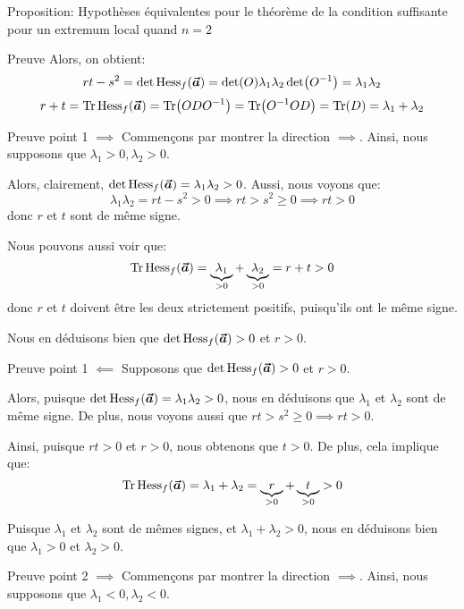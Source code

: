 \documentclass[a4paper]{article}
\begin{document}
\begin{parag}{Proposition: Hypothèses équivalentes pour le théorème de la condition suffisante pour un extremum local quand $n = 2$}
\begin{subparag}{Preuve}
        Alors, on obtient: 
        \[rt - s^2 = \det\Hess_f\left(\bvec{a}\right) = \det\left(O\right)\lambda_1 \lambda_2 \det\left(O^{-1}\right) = \lambda_1 \lambda_2\] 
        \[r + t = \Tr\Hess_f\left(\bvec{a}\right) = \Tr\left(O D O^{-1}\right) = \Tr\left(O^{-1} O D\right) = \Tr\left(D\right) = \lambda_1 + \lambda_2\]
    \end{subparag}

    \begin{subparag}{Preuve point 1 $\implies$}
         Commençons par montrer la direction $\implies$. Ainsi, nous supposons que $\lambda_1 > 0, \lambda_2 > 0$.

         Alors, clairement, $\det\Hess_f\left(\bvec{a}\right) = \lambda_1 \lambda_2 > 0$. Aussi, nous voyons que: 
         \[\lambda_1 \lambda_2 = rt - s^2 > 0 \implies rt > s^2 \geq 0 \implies rt > 0\]
         donc $r$ et $t$ sont de même signe.

         Nous pouvons aussi voir que: 
         \[\Tr\Hess_f\left(\bvec{a}\right) = \underbrace{\lambda_1}_{> 0} + \underbrace{\lambda_2}_{> 0} = r + t > 0\]
         donc $r$ et $t$ doivent être les deux strictement positifs, puisqu'ils ont le même signe.

         Nous en déduisons bien que $\det\Hess_f\left(\bvec{a}\right) > 0$ et $r > 0$.
    \end{subparag}
    
    \begin{subparag}{Preuve point 1 $\impliedby$}
        Supposons que $\det\Hess_f\left(\bvec{a}\right) > 0$ et $r > 0$.

        Alors, puisque $\det\Hess_f\left(\bvec{a}\right) = \lambda_1 \lambda_2 > 0$, nous en déduisons que $\lambda_1$ et $\lambda_2$ sont de même signe. De plus, nous voyons aussi que $rt > s^2 \geq 0 \implies rt > 0$.

        Ainsi, puisque $rt > 0$ et $r > 0$, nous obtenons que $t > 0$. De plus, cela implique que: 
        \[\Tr\Hess_f\left(\bvec{a}\right) = \lambda_1 + \lambda_2 = \underbrace{r}_{> 0} + \underbrace{t}_{> 0} > 0\]
        
        Puisque $\lambda_1$ et $\lambda_2$ sont de mêmes signes, et $\lambda_1 + \lambda_2 > 0$, nous en déduisons bien que $\lambda_1 > 0$ et $\lambda_2 > 0$.
    \end{subparag}

    \begin{subparag}{Preuve point 2 $\implies$}
         Commençons par montrer la direction $\implies$. Ainsi, nous supposons que $\lambda_1 < 0, \lambda_2 < 0$.


\end{subparag}
\end{parag}
\end{document}
